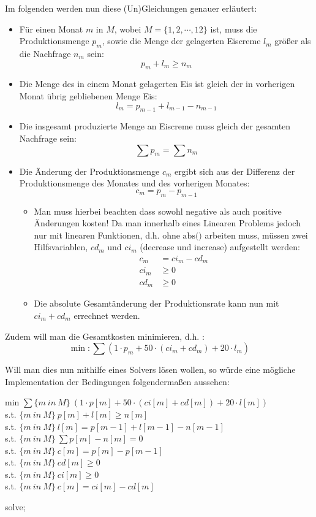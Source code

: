 Im folgenden werden nun diese (Un)Gleichungen genauer erläutert:

\begin{itemize}
\item Für einen Monat $m$ in $M$, wobei $M = \{1, 2, \cdots, 12\}$ ist, muss die Produktionsmenge $p_m$, sowie die Menge der gelagerten Eiscreme $l_m$ größer als die Nachfrage $n_m$ sein:
\[ p_m + l_m \geq n_m \]
\item Die Menge des in einem Monat gelagerten Eis ist gleich der in vorherigen Monat übrig gebliebenen Menge Eis:
\[ l_m = p_{m-1} + l_{m-1} - n_{m-1} \]
\item Die insgesamt produzierte Menge an Eiscreme muss gleich der gesamten Nachfrage sein:
\[ \sum p_m = \sum n_m \]
\item Die Änderung der Produktionsmenge $c_m$ ergibt sich aus der Differenz der Produktionsmenge des Monates und des vorherigen Monates: 
\[ c_m = p_{m} - p_{m-1} \] 
	\begin{itemize}
	\item Man muss hierbei beachten dass sowohl negative als auch positive Änderungen kosten! Da man innerhalb eines Linearen Problems jedoch nur mit linearen Funktionen, d.h. ohne $\text{abs()}$ arbeiten muss, müssen zwei Hilfsvariablen, $cd_m$ und $ci_m$ (decrease und increase) aufgestellt werden:
	\begin{align*}
	c_m &= ci_m - cd_m \\
	ci_m &\geq 0		\\
	cd_m &\geq 0
	\end{align*}
	
	\item Die absolute Gesamtänderung der Produktionsrate kann nun mit $ci_m + cd_m$ errechnet werden.
 	\end{itemize}
\end{itemize}

Zudem will man die Gesamtkosten minimieren, d.h. :
\[ \min: \sum (1 \cdot p_m + 50 \cdot (ci_m + cd_m) + 20 \cdot l_m)\]

Will man dies nun mithilfe eines Solvers lösen wollen, so würde eine mögliche Implementation der Bedingungen folgendermaßen aussehen:
\newline

min $\sum\{m~in~M\} ~ (1 \cdot p[m] + 50 \cdot (ci[m] + cd[m]) + 20 \cdot l[m])$ \\
s.t. $\{m~in~M\} ~ p[m] + l[m] \geq n[m]$ \\
s.t. $\{m~in~M\} ~ l[m] = p[m - 1] + l[m - 1] - n[m - 1]$ \\
s.t. $\{m~in~M\} ~ \sum p[m] - n[m] = 0$ 	\\
s.t. $\{m~in~M\} ~ c[m] = p[m] - p[m-1]$ 	\\
s.t. $\{m~in~M\} ~ cd[m] \geq 0$			\\
s.t. $\{m~in~M\} ~ ci[m] \geq 0$			\\
s.t. $\{m~in~M\} ~ c[m] = ci[m] - cd[m]$	
\newline

solve;